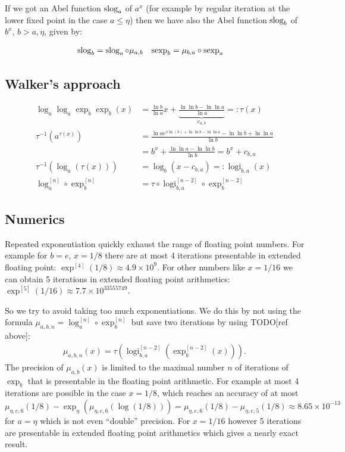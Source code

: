 \documentclass{article}
\numberwithin{equation}{section}
\begin{document}
If we got an Abel function $\operatorname{slog}_a$ of $a^x$ (for example by regular
iteration at the lower fixed point in the case $a\le\eta$) then we have
also the Abel function $\operatorname{slog}_b$ of $b^x$, $b>a,\eta$, given by:

\begin{align}\label{eq:superchange}
  \operatorname{slog}_b&=\operatorname{slog}_a\circ\mu_{a,b} &\operatorname{sexp}_b&=\mu_{b,a}\circ\operatorname{sexp}_a
\end{align}

\subsection{Walker's approach}
\newcommand{\logi}{\operatorname{logi}}
\begin{align*}
  \log_a\log_a\exp_b\exp_b(x)&=\frac{\ln b}{\ln a}x + \underbrace{\frac{\ln \ln b -
    \ln \ln a}{\ln a}}_{c_{a,b}}=:\tau(x)\\
  \tau^{-1}(a^{\tau(x)})&=\frac{\ln a e^{x\ln(b) + \ln \ln b - \ln \ln
      a}-\ln \ln b + \ln \ln a}{\ln b}
  \\&=b^x+\frac{\ln\ln a-\ln\ln b}{\ln b} = b^x + c_{b,a}
  \\\tau^{-1}(\log_a(\tau(x)))&=\log_b(x-c_{b,a})=:\logi_{b,a}(x)
  \\\log_a^{[n]}\circ\exp_b^{[n]}&= \tau\circ \logi_{b,a}^{[n-2]}\circ
  \exp_b^{[n-2]}
\end{align*}
\subsection{Numerics}
Repeated exponentiation quickly exhaust the range of floating point
numbers. For example for $b=e$, $x=1/8$ there are at most 4 iterations
presentable in extended floating point:
$\exp^{[4]}(1/8)\approx 4.9\times 10^{9}$. For other numbers like $x=1/16$ we can
obtain 5 iterations in extended floating point arithmetics:
$\exp^{[5]}(1/16)\approx 7.7\times 10^{33555749}$. 

So we try to avoid taking too much exponentiations. We do this by not
using the formula $\mu_{a,b,n}=\log_{a}^{[n]}\circ \exp_b^{[n]}$ but save two
iterations by using TODO[ref above]:
\begin{align*}
  \mu_{a,b,n}(x) =\tau(\logi_{b,a}^{[n-2]}(\exp_b^{[n-2]}(x))).
\end{align*}
The precision of $\mu_{a,b}(x)$ is limited to the maximal number $n$ of
iterations of $\exp_b$ that is presentable in the floating point
arithmetic. For example at most 4 iterations are possible in the case
$x=1/8$, which reaches an accuracy of at most
$\mu_{\eta,e,6}(1/8)-\exp_\eta(\mu_{\eta,e,6}(\log(1/8)))=\mu_{\eta,e,6}(1/8)-\mu_{\eta,e,5}(1/8)\approx
8.65\times 10^{-13}$ for $a=\eta$ which is not even ``double'' 
precision. For $x=1/16$ however 5 iterations are presentable in
extended floating point arithmetics which gives a nearly exact result. 
\end{document}
